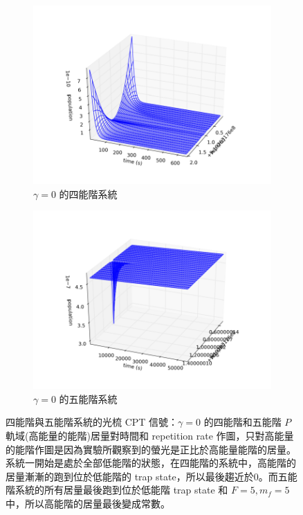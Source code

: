 \documentclass[11pt,a4paper]{article}
\begin{document}
 \begin{figure}[H]
 \centering
 \begin{subfigure}[b]{0.45\textwidth}
 \centering
 \includegraphics[width=\textwidth]{small_system/four_level_1000_no_gamma.pdf}
 \caption{$\gamma = 0$ 的四能階系統}
 \label{fig:four_level_result_nogamma}
 \end{subfigure}
 \begin{subfigure}[b]{0.45\textwidth}
 \centering
 \includegraphics[width=\textwidth]{small_system/five_level_10_nogamma.pdf}
 \caption{$\gamma = 0$ 的五能階系統 }
 \label{fig:five_level_result_nogamma}
 \end{subfigure}
 \caption{四能階與五能階系統的光梳 CPT 信號：$\gamma = 0$ 的四能階和五能階 $P$ 軌域(高能量的能階)居量對時間和 repetition rate 作圖，只對高能量的能階作圖是因為實驗所觀察到的螢光是正比於高能量能階的居量。系統一開始是處於全部低能階的狀態，在四能階的系統中，高能階的居量漸漸的跑到位於低能階的 trap state，所以最後趨近於0。而五能階系統的所有居量最後跑到位於低能階 trap state 和 $F=5, m_f=5$ 中，所以高能階的居量最後變成常數。}
 \label{fig:nogamma}
 \end{figure}
\end{document}
